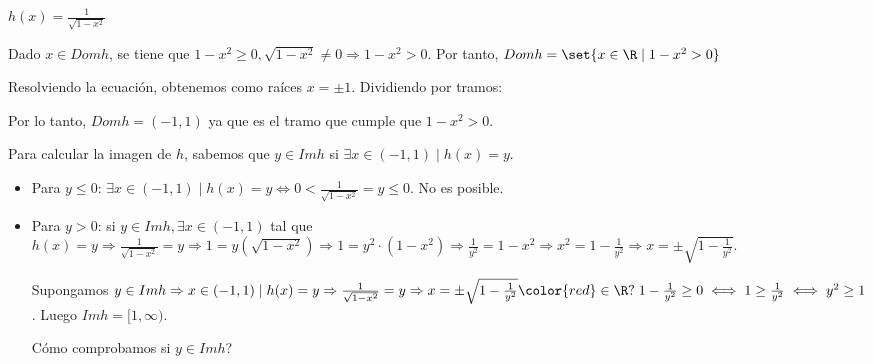 \begin{example}
	\(h(x) = \frac{1}{\sqrt{1 - x^{2} } }\)
	
	Dado \(x \in Domh \), se tiene que \(1 - x^{2} \geq 0, \sqrt{1 - x^{2}}  \neq 0 \Rightarrow 1-x^{2}  > 0 \). Por tanto, \(Domh = \set{x \in \R \mid 1 - x^{2} > 0  }\)
	
	Resolviendo la ecuación, obtenemos como raíces \(x = \pm 1 \). Dividiendo por tramos: 
	
	\begin{figure}[H]
		\centering
	\end{figure}
	Por lo tanto, \(Domh = (-1,1 )\) ya que es el tramo que cumple que \(1 - x^{2} > 0\). 
	
	Para calcular la imagen de \(h \), sabemos que \( y \in Imh\) si \(\exists x \in (-1,1) \mid h(x) = y\).
	
	\begin{itemize}
		\item Para \(y \leq  0 \): \(\exists x \in (-1,1) \mid h(x) = y \iff 0 < \frac{1}{\sqrt{1 - x^{2} } } = y \leq  0\). No es posible.
		\item Para \(y > 0 \): si \(y \in Imh, \exists x \in (-1,1 )\) tal que \(h(x) = y \Rightarrow \frac{1}{\sqrt{1 - x^{2} } } = y \Rightarrow 1 = y(\sqrt{1 - x^{2} } ) \Rightarrow 1 = y^{2} \cdot (1 - x^{2} ) \Rightarrow \frac{1}{y^{2} } = 1 - x^{2} \Rightarrow x^{2} = 1 - \frac{1}{y^{2} } \Rightarrow x = \pm \sqrt{1 - \frac{1}{y^{2} }}\).
		      
		      Supongamos \(y \in Imh \Rightarrow x \in (-1,1) \mid h(x) = y \Rightarrow \frac{1}{\sqrt{1 - x^{2} } } = y \Rightarrow x = \pm \sqrt{1 - \frac{1}{y^{2} }} {\color{red}\in \R ? } \; 1 - \frac{1}{y^{2} } \geq 0 \iff 1 \geq  \frac{1}{y^{2} } \iff y^{2} \geq 1  \). Luego \(Imh = [1,\infty)\).
		      
		      Cómo comprobamos si \(y \in Imh \)?
		      

\end{itemize}
\end{example}
